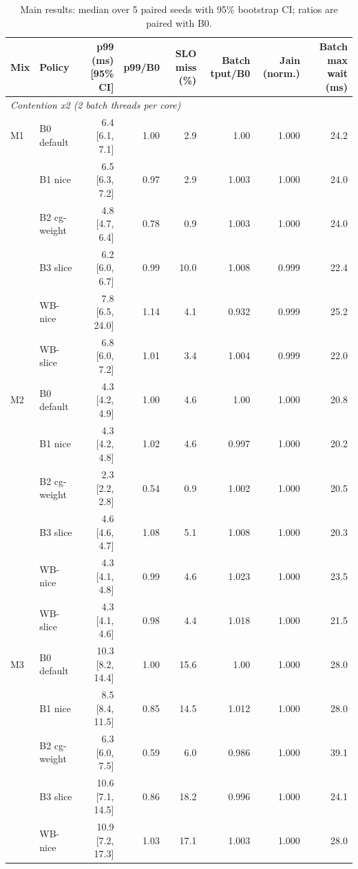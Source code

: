 \begin{table}[t]
\centering
\footnotesize
\caption{Main results: median over 5 paired seeds with 95\% bootstrap CI; ratios are paired with B0.}
\label{tab:main}
\begin{tabular}{llrrrrrr}
\toprule
Mix & Policy & p99 (ms) [95\% CI] & p99/B0 & SLO miss (\%) & Batch tput/B0 & Jain (norm.) & Batch max wait (ms) \\
\midrule
\multicolumn{8}{l}{\textit{Contention x2 (2 batch threads per core)}} \\
M1 & B0 default & 6.4 {\scriptsize[6.1, 7.1]} & 1.00 & 2.9 & 1.00 & 1.000 & 24.2 \\
 & B1 nice & 6.5 {\scriptsize[6.3, 7.2]} & 0.97 & 2.9 & 1.003 & 1.000 & 24.0 \\
 & B2 cg-weight & 4.8 {\scriptsize[4.7, 6.4]} & 0.78 & 0.9 & 1.003 & 1.000 & 24.0 \\
 & B3 slice & 6.2 {\scriptsize[6.0, 6.7]} & 0.99 & 10.0 & 1.008 & 0.999 & 22.4 \\
 & WB-nice & 7.8 {\scriptsize[6.5, 24.0]} & 1.14 & 4.1 & 0.932 & 0.999 & 25.2 \\
 & WB-slice & 6.8 {\scriptsize[6.0, 7.2]} & 1.01 & 3.4 & 1.004 & 0.999 & 22.0 \\
\addlinespace[2pt]
M2 & B0 default & 4.3 {\scriptsize[4.2, 4.9]} & 1.00 & 4.6 & 1.00 & 1.000 & 20.8 \\
 & B1 nice & 4.3 {\scriptsize[4.2, 4.8]} & 1.02 & 4.6 & 0.997 & 1.000 & 20.2 \\
 & B2 cg-weight & 2.3 {\scriptsize[2.2, 2.8]} & 0.54 & 0.9 & 1.002 & 1.000 & 20.5 \\
 & B3 slice & 4.6 {\scriptsize[4.6, 4.7]} & 1.08 & 5.1 & 1.008 & 1.000 & 20.3 \\
 & WB-nice & 4.3 {\scriptsize[4.1, 4.8]} & 0.99 & 4.6 & 1.023 & 1.000 & 23.5 \\
 & WB-slice & 4.3 {\scriptsize[4.1, 4.6]} & 0.98 & 4.4 & 1.018 & 1.000 & 21.5 \\
\addlinespace[2pt]
M3 & B0 default & 10.3 {\scriptsize[8.2, 14.4]} & 1.00 & 15.6 & 1.00 & 1.000 & 28.0 \\
 & B1 nice & 8.5 {\scriptsize[8.4, 11.5]} & 0.85 & 14.5 & 1.012 & 1.000 & 28.0 \\
 & B2 cg-weight & 6.3 {\scriptsize[6.0, 7.5]} & 0.59 & 6.0 & 0.986 & 1.000 & 39.1 \\
 & B3 slice & 10.6 {\scriptsize[7.1, 14.5]} & 0.86 & 18.2 & 0.996 & 1.000 & 24.1 \\
 & WB-nice & 10.9 {\scriptsize[7.2, 17.3]} & 1.03 & 17.1 & 1.003 & 1.000 & 28.0 \\

\end{tabular}
\end{table}
